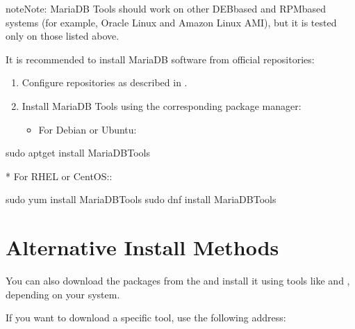 \documentclass[letterpaper,10pt,english]{sphinxmanual}
\begin{document}
\begin{sphinxadmonition}{note}{Note:}
\sphinxAtStartPar
MariaDB Tools should work on other DEB\sphinxhyphen{}based and RPM\sphinxhyphen{}based systems
(for example, Oracle Linux and Amazon Linux AMI),
but it is tested only on those listed above.
\end{sphinxadmonition}

\sphinxAtStartPar
It is recommended to install MariaDB software from official repositories:
\begin{enumerate}
%
\item {} 
\sphinxAtStartPar
Configure repositories as described in
.

\item {} 
\sphinxAtStartPar
Install MariaDB Tools using the corresponding package manager:
\begin{itemize}
\item {} 
\sphinxAtStartPar
For Debian or Ubuntu:

\end{itemize}

\end{enumerate}

\begin{sphinxVerbatim}[commandchars=\\\{\}]
   sudo apt\PYGZhy{}get install MariaDB\PYGZhy{}Tools

* For RHEL or CentOS::
\end{sphinxVerbatim}

\begin{sphinxVerbatim}[commandchars=\\\{\}]
sudo yum install MariaDB\PYGZhy{}Tools
sudo dnf install MariaDB\PYGZhy{}Tools
\end{sphinxVerbatim}


\section{Alternative Install Methods}
\label{\detokenize{installation:alternative-install-methods}}
\sphinxAtStartPar
You can also download the packages from the
and install it using tools like  and ,
depending on your system.

\sphinxAtStartPar
If you want to download a specific tool, use the following address:
\end{document}
